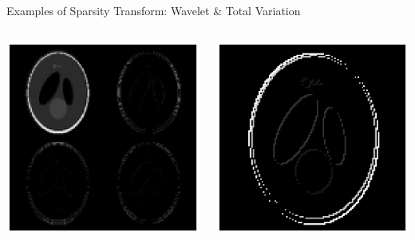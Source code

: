 \documentclass[aspectratio=169]{beamer}
\begin{document}
	\begin{frame}{Examples of Sparsity Transform: Wavelet \& Total Variation}
		\begin{columns}
			\centering
			\includegraphics[width=\columnwidth]{figures/spatial_wavelet.png}
			
			\centering
			\includegraphics[width=\columnwidth]{figures/spatial_tv.png}
		\end{columns}
	\end{frame}
	
\end{document}
